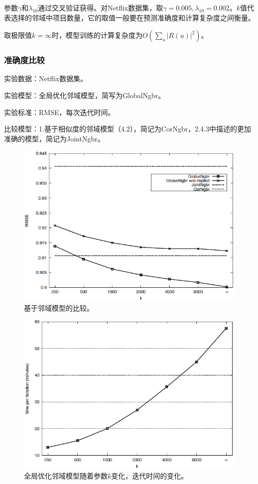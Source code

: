\documentclass{article}
\begin{document}
参数$\gamma$和$\lambda_{10}$通过交叉验证获得。对Netflix数据集，取$\gamma=0.005,\lambda_{10}=0.002$。$k$值代表选择的邻域中项目数量，它的取值一般要在预测准确度和计算复杂度之间衡量。

取极限值$k=\infty$时，模型训练的计算复杂度为$O(\sum_{u}|R(u)|^2)$。

\subsubsection{准确度比较}
实验数据：Netflix数据集。

实验模型：全局优化邻域模型，简写为GlobalNgbr。

实验标准：RMSE，每次迭代时间。

比较模型：1.基于相似度的邻域模型（4.2），简记为CorNgbr，2.4.3中描述的更加准确的模型，简记为JointNgbr。

\begin{figure}[htb]
	\centering
	\includegraphics[scale=0.6]{f1.jpg}
	\caption{基于邻域模型的比较。}
\end{figure}

\begin{figure}[htb]
	\centering
	\includegraphics[scale=0.6]{f2.jpg}
	\caption{全局优化邻域模型随着参数$k$变化，迭代时间的变化。}
\end{figure}
\end{document}
